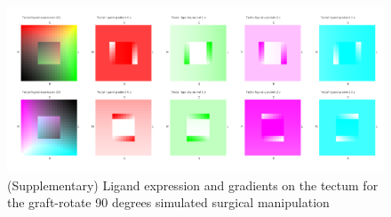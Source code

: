 \documentclass[11pt, a4paper]{article}
\begin{document}
\begin{figure}
\includegraphics[width=\linewidth]{./images/Tissuevisb.png}
\caption{(Supplementary) Ligand expression and gradients on the tectum for the
graft-rotate 90 degrees simulated surgical manipulation}
\label{f:trot90}
\end{figure}

%
\end{document}
